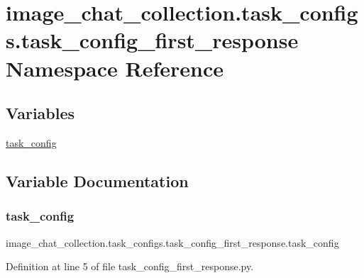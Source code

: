 \hypertarget{namespaceimage__chat__collection_1_1task__configs_1_1task__config__first__response}{}\section{image\+\_\+chat\+\_\+collection.\+task\+\_\+configs.\+task\+\_\+config\+\_\+first\+\_\+response Namespace Reference}
\label{namespaceimage__chat__collection_1_1task__configs_1_1task__config__first__response}
\subsection*{Variables}
\begin{DoxyCompactItemize}
\item 
\hyperlink{namespaceimage__chat__collection_1_1task__configs_1_1task__config__first__response_a2a7095ffbde7fcbe33f8758f018f14bf}{task\+\_\+config}
\end{DoxyCompactItemize}


\subsection{Variable Documentation}
\mbox{\label{namespaceimage__chat__collection_1_1task__configs_1_1task__config__first__response_a2a7095ffbde7fcbe33f8758f018f14bf}} 
\subsubsection{\texorpdfstring{task\+\_\+config}{task\_config}}
{\footnotesize\ttfamily image\+\_\+chat\+\_\+collection.\+task\+\_\+configs.\+task\+\_\+config\+\_\+first\+\_\+response.\+task\+\_\+config}



Definition at line 5 of file task\+\_\+config\+\_\+first\+\_\+response.\+py.


